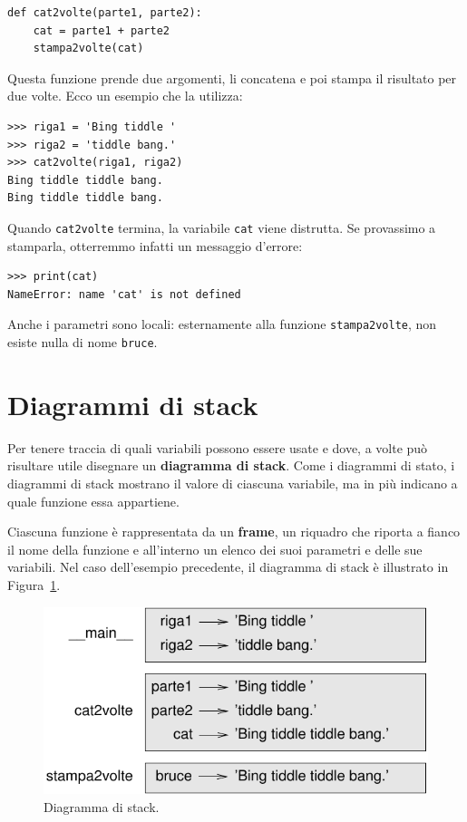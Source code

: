 \documentclass[10pt]{book}
\begin{document}
\begin{verbatim}
def cat2volte(parte1, parte2):
    cat = parte1 + parte2
    stampa2volte(cat)
\end{verbatim}
%
Questa funzione prende due argomenti, li concatena e poi stampa il risultato per due volte. Ecco un esempio che la utilizza:

\begin{verbatim}
>>> riga1 = 'Bing tiddle '
>>> riga2 = 'tiddle bang.'
>>> cat2volte(riga1, riga2)
Bing tiddle tiddle bang.
Bing tiddle tiddle bang.
\end{verbatim}
%
Quando \verb"cat2volte" termina, la variabile {\tt cat} viene distrutta. Se provassimo a stamparla, otterremmo infatti un messaggio d'errore:

\begin{verbatim}
>>> print(cat)
NameError: name 'cat' is not defined
\end{verbatim}
%
Anche i parametri sono locali: esternamente alla funzione \verb"stampa2volte", non esiste nulla di nome {\tt bruce}.


\section{Diagrammi di stack}
\label{stackdiagram}

Per tenere traccia di quali variabili possono essere usate e dove, a volte può risultare utile disegnare un {\bf diagramma di stack}. Come i diagrammi di stato, i diagrammi di stack mostrano il valore di ciascuna variabile, ma in più indicano a quale funzione essa appartiene.

Ciascuna funzione è rappresentata da un {\bf frame}, un riquadro che riporta a fianco il nome della funzione e all'interno un elenco dei suoi parametri e delle sue variabili. Nel caso dell'esempio precedente, il diagramma di stack è illustrato in Figura~\ref{fig.stack}.

\begin{figure}
\centerline
{\includegraphics[scale=0.8]{figs/stack.pdf}}
\caption{Diagramma di stack.}
\label{fig.stack}
\end{figure}
\end{document}
